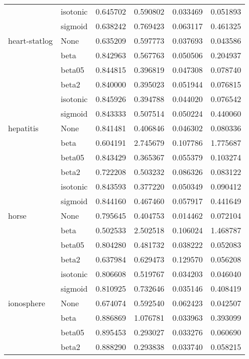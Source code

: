 \begin{tabular}{llrrrr}
        & isotonic &  0.645702 &   0.590802 &  0.033469 &  0.051893 \\
        & sigmoid &  0.638242 &   0.769423 &  0.063117 &  0.461325 \\
heart-statlog & None &  0.635209 &   0.597773 &  0.037693 &  0.043586 \\
        & beta &  0.842963 &   0.567763 &  0.050506 &  0.204937 \\
        & beta05 &  0.844815 &   0.396819 &  0.047308 &  0.078740 \\
        & beta2 &  0.840000 &   0.395023 &  0.051944 &  0.076815 \\
        & isotonic &  0.845926 &   0.394788 &  0.044020 &  0.076542 \\
        & sigmoid &  0.843333 &   0.507514 &  0.050224 &  0.440060 \\
hepatitis & None &  0.841481 &   0.406846 &  0.046302 &  0.080336 \\
        & beta &  0.604191 &   2.745679 &  0.107786 &  1.775687 \\
        & beta05 &  0.843429 &   0.365367 &  0.055379 &  0.103274 \\
        & beta2 &  0.722208 &   0.503232 &  0.086326 &  0.083122 \\
        & isotonic &  0.843593 &   0.377220 &  0.050349 &  0.090412 \\
        & sigmoid &  0.844160 &   0.467460 &  0.057917 &  0.441649 \\
horse & None &  0.795645 &   0.404753 &  0.014462 &  0.072104 \\
        & beta &  0.502533 &   2.502518 &  0.106024 &  1.468787 \\
        & beta05 &  0.804280 &   0.481732 &  0.038222 &  0.052083 \\
        & beta2 &  0.637984 &   0.629473 &  0.129570 &  0.056208 \\
        & isotonic &  0.806608 &   0.519767 &  0.034203 &  0.046040 \\
        & sigmoid &  0.810925 &   0.732646 &  0.035146 &  0.408419 \\
ionosphere & None &  0.674074 &   0.592540 &  0.062423 &  0.042507 \\
        & beta &  0.886869 &   1.076781 &  0.033963 &  0.393099 \\
        & beta05 &  0.895453 &   0.293027 &  0.033276 &  0.060690 \\
        & beta2 &  0.888290 &   0.293838 &  0.033740 &  0.058215 \\

\end{tabular}
